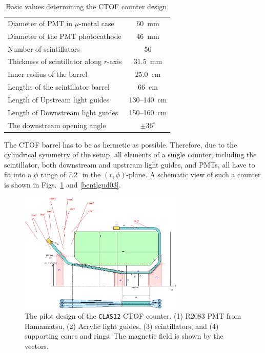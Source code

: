 \begin{table}[htbp]
\begin{center}
\begin{tabular}{|l|c|} \hline
Diameter of PMT in $\mu$-metal case        & 60~mm       \\
Diameter of the PMT photocathode          & 46~mm       \\
Number of scintillators                    & 50          \\
Thickness of scintillator along $r$-axis   & 31.5~mm     \\
Inner radius of the  barrel                & 25.0~cm     \\
Lengths of the scintillator barrel         & 66~cm       \\
Length of Upstream light guides            & 130--140~cm \\
Length of Downstream light guides          & 150--160~cm \\
The downstream opening angle               & $\pm 36^\circ$ \\\hline
\end{tabular}
\caption{\small{Basic values determining the CTOF counter design.}}
\label{basval}
\end{center}
\end{table}

The CTOF barrel has to be as hermetic as possible.  Therefore, due to the 
cylindrical symmetry of the setup, all elements of a single counter, 
including the scintillator, both downstream and upstream light guides, and 
PMTs, all have to fit into a $\phi$ range of 7.2$^\circ$ in the 
$(r,\phi)$-plane.  A schematic view of such a counter is shown in 
Figs.~\ref{bentlg03} and \ref{bentlgud03}.

\begin{figure}[htbp]
\centering
\includegraphics[width=0.7\textwidth]{JLABt0R2083-2.ps}
\caption{\small{The pilot design of the {\tt CLAS12} CTOF counter.
(1) R2083 PMT from Hamamatsu, (2) Acrylic light guides, (3) scintillators,
and (4) supporting cones and rings. The magnetic field is shown by the
vectors.}}
\label{bentlg03}
\end{figure}

